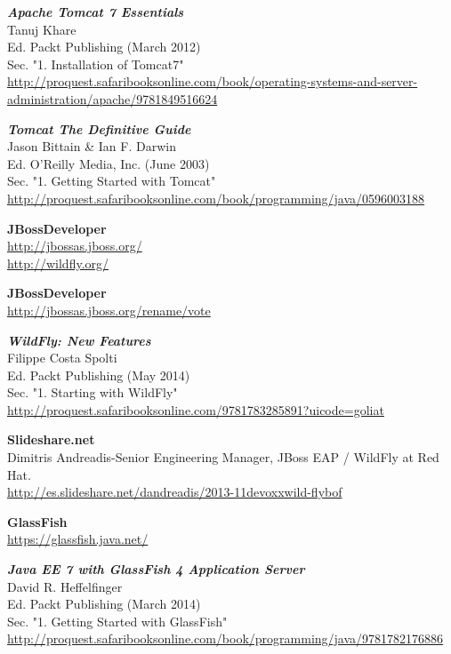 \documentclass[a4paper, 10pt]{article}
\begin{document}
\begin{thebibliography}{10}
	\textbf{\textit{Apache Tomcat 7 Essentials}}\\
	Tanuj Khare\\
	Ed. Packt Publishing (March 2012)\\
	Sec. "1. Installation of Tomcat7"\\
		\url{http://proquest.safaribooksonline.com/book/operating-systems-and-server-administration/apache/9781849516624}
	
	\textbf{\textit{Tomcat The Definitive Guide}}\\
	Jason Bittain \& Ian F. Darwin\\
	Ed. O'Reilly Media, Inc. (June 2003)\\
	Sec. "1. Getting Started with Tomcat"\\
		\url{http://proquest.safaribooksonline.com/book/programming/java/0596003188}
	
	\textbf{JBossDeveloper}\\
		\url{http://jbossas.jboss.org/}\\
		\url{http://wildfly.org/}
	
	\textbf{JBossDeveloper}\\
		\url{http://jbossas.jboss.org/rename/vote}
	
	\textbf{\textit{WildFly: New Features}}\\
	Filippe Costa Spolti\\
	Ed. Packt Publishing (May 2014)\\
	Sec. "1. Starting with WildFly"\\
		\url{http://proquest.safaribooksonline.com/9781783285891?uicode=goliat} 
	
	\textbf{Slideshare.net}\\
	Dimitris Andreadis-Senior Engineering Manager, JBoss EAP / WildFly at Red Hat.\\
		\url{http://es.slideshare.net/dandreadis/2013-11devoxxwild-flybof}
	
	\textbf{GlassFish}\\
		\url{https://glassfish.java.net/}

	\textbf{\textit{Java EE 7 with GlassFish 4 Application Server}}\\
	David R. Heffelfinger\\
	Ed. Packt Publishing (March 2014)\\
	Sec. "1. Getting Started with GlassFish"\\
		\url{http://proquest.safaribooksonline.com/book/programming/java/9781782176886}
		

\end{thebibliography}
\end{document}
